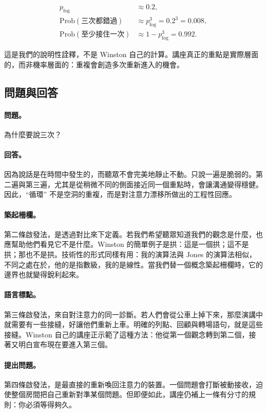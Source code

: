 \begin{align}
p_{\mathrm{fog}} &\approx 0.2,\\
\mathrm{Prob}(\text{三次都錯過}) &\approx p_{\mathrm{fog}}^3 = 0.2^3 = 0.008,\\
\mathrm{Prob}(\text{至少接住一次}) &\approx 1-p_{\mathrm{fog}}^3 = 0.992.
\end{align}

\begin{remark}
這是我們的說明性詮釋，不是 Winston 自己的計算。講座真正的重點是實際層面的，而非機率層面的：重複會創造多次重新進入的機會。
\end{remark}

\subsection{問題與回答}

\paragraph{問題。} 為什麼要說三次？

\paragraph{回答。} 因為說話是在時間中發生的，而聽眾不會完美地靜止不動。只說一遍是脆弱的。第二遍與第三遍，尤其是從稍微不同的側面接近同一個重點時，會讓溝通變得穩健。因此，``循環'' 不是空洞的重複，而是對注意力漂移所做出的工程性回應。

\paragraph{築起柵欄。} 第二條啟發法，是透過對比來下定義。若我們希望聽眾知道我們的觀念是什麼，也應幫助他們看見它不是什麼。Winston 的簡單例子是拱：這是一個拱；這不是拱；那也不是拱。技術性的形式同樣有用：我的演算法與 Jones 的演算法相似，不同之處在於，他的是指數級，我的是線性。當我們替一個概念築起柵欄時，它的邊界也就變得銳利起來。

\paragraph{語言標點。} 第三條啟發法，來自對注意力的同一診斷。若人們會從公車上掉下來，那麼演講中就需要有一些接縫，好讓他們重新上車。明確的列點、回顧與轉場語句，就是這些接縫。Winston 自己的講座正示範了這種方法：他從第一個觀念轉到第二個，接著又明白宣布現在要進入第三個。

\paragraph{提出問題。} 第四條啟發法，是最直接的重新喚回注意力的裝置。一個問題會打斷被動接收，迫使整個房間把自己重新對準某個問題。但即便如此，講座仍補上一條有分寸的規則：你必須等得夠久。

